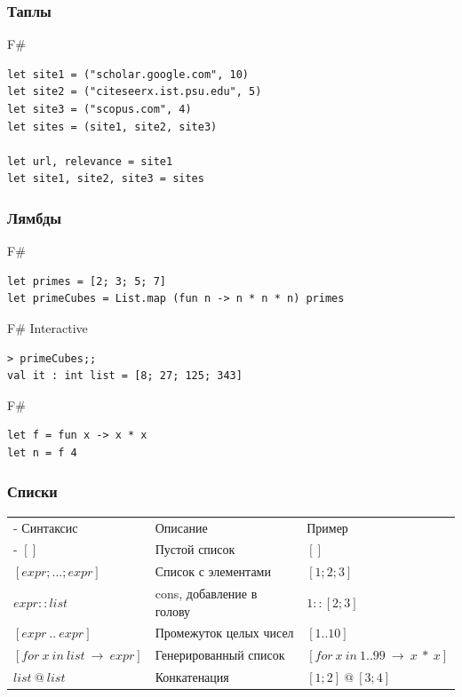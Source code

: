 \documentclass[xetex,mathserif,serif]{beamer}
\begin{document}
	\begin{frame}[fragile]
		\frametitle{Таплы}
		\begin{exampleblock}{F\#}
			\begin{verbatim}
let site1 = ("scholar.google.com", 10)
let site2 = ("citeseerx.ist.psu.edu", 5)
let site3 = ("scopus.com", 4)
let sites = (site1, site2, site3)

let url, relevance = site1
let site1, site2, site3 = sites
			\end{verbatim}
		\end{exampleblock}
\end{frame}

	\begin{frame}[fragile]
		\frametitle{Лямбды}
		\begin{exampleblock}{F\#}
			\begin{verbatim}
let primes = [2; 3; 5; 7]
let primeCubes = List.map (fun n -> n * n * n) primes
			\end{verbatim}
		\end{exampleblock}
		\begin{alertblock}{F\# Interactive}
			\begin{verbatim}
> primeCubes;;
val it : int list = [8; 27; 125; 343]
			\end{verbatim}
		\end{alertblock}
		\begin{exampleblock}{F\#}
			\begin{verbatim}
let f = fun x -> x * x
let n = f 4
			\end{verbatim}
		\end{exampleblock}
\end{frame}

	\begin{frame}
		\frametitle{Списки}
		\begin{small}
			\begin{tabu} {| X[0.9 l p] | X[1 l p] | X[1 l p] |}
				\tabucline-
				Синтаксис                               & Описание                  & Пример                             \\
				\tabucline-
				\everyrow{\tabucline-}
				$[]$                                    & Пустой список             & $[]$                               \\
				$[expr; ...; expr]$                     & Список с элементами       & $[1; 2; 3]$                        \\
				$expr :: list$                          & cons, добавление в голову & $1 :: [2; 3]$                      \\
				$[expr\ ..\ expr]$                      & Промежуток целых чисел    & $[1 .. 10]$                        \\
				$[for\ x\ in\ list\ \rightarrow\ expr]$ & Генерированный список     & $[for\ x\ in\ 1..99\ \rightarrow\ x\ *\ x]$ \\
				$list\ @\ list$                         & Конкатенация              & $[1; 2]\ @\ [3; 4]$                \\
			\end{tabu}
		\end{small}
	\end{frame}
\end{document}
